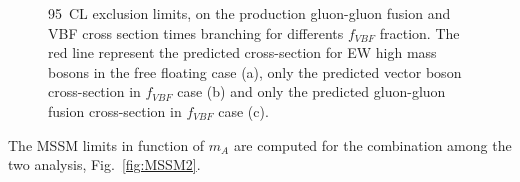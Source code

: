 \begin{figure}[htb]
\centering
{}
\caption{95\ CL exclusion limits, on the production gluon-gluon fusion and VBF cross section times branching 
for differents $f_{VBF}$ fraction. The red line represent the predicted cross-section for EW high
mass bosons in the free floating case (a), only the predicted vector boson cross-section in
 $f_{VBF}$ case (b) and only the predicted gluon-gluon fusion cross-section in $f_{VBF}$ case (c).}
    \label{wwe}
\end{figure}
The MSSM limits  in function of $m_A$ are computed for the combination among the two analysis, Fig.~\ref{fig:MSSM2}.
